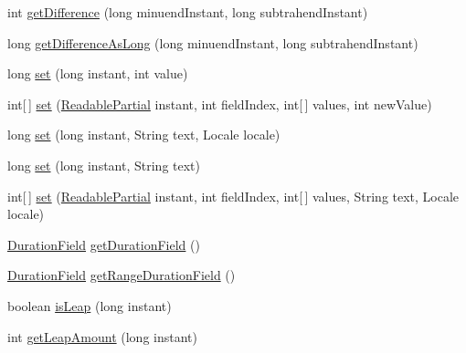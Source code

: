 \begin{DoxyCompactItemize}
\item 
int \hyperlink{classorg_1_1joda_1_1time_1_1field_1_1_unsupported_date_time_field_ad9c690727e67fbee862ec3e133f603d2}{get\-Difference} (long minuend\-Instant, long subtrahend\-Instant)
\item 
long \hyperlink{classorg_1_1joda_1_1time_1_1field_1_1_unsupported_date_time_field_ade939fccf0f23afa58b747b1e1174291}{get\-Difference\-As\-Long} (long minuend\-Instant, long subtrahend\-Instant)
\item 
long \hyperlink{classorg_1_1joda_1_1time_1_1field_1_1_unsupported_date_time_field_a009efc3018a1abd63bc52984d37a0e8b}{set} (long instant, int value)
\item 
int\mbox{[}$\,$\mbox{]} \hyperlink{classorg_1_1joda_1_1time_1_1field_1_1_unsupported_date_time_field_af8a830279fd53cc1f4e274abfbf19768}{set} (\hyperlink{interfaceorg_1_1joda_1_1time_1_1_readable_partial}{Readable\-Partial} instant, int field\-Index, int\mbox{[}$\,$\mbox{]} values, int new\-Value)
\item 
long \hyperlink{classorg_1_1joda_1_1time_1_1field_1_1_unsupported_date_time_field_a20e8669e6da34326c6fd56c904a6d735}{set} (long instant, String text, Locale locale)
\item 
long \hyperlink{classorg_1_1joda_1_1time_1_1field_1_1_unsupported_date_time_field_a03b971edb36dc3c4de38afba467a9820}{set} (long instant, String text)
\item 
int\mbox{[}$\,$\mbox{]} \hyperlink{classorg_1_1joda_1_1time_1_1field_1_1_unsupported_date_time_field_a0a4d5a929e35df332767b7441bf88c09}{set} (\hyperlink{interfaceorg_1_1joda_1_1time_1_1_readable_partial}{Readable\-Partial} instant, int field\-Index, int\mbox{[}$\,$\mbox{]} values, String text, Locale locale)
\item 
\hyperlink{classorg_1_1joda_1_1time_1_1_duration_field}{Duration\-Field} \hyperlink{classorg_1_1joda_1_1time_1_1field_1_1_unsupported_date_time_field_aff9c51f0f497129187379598a3d913e2}{get\-Duration\-Field} ()
\item 
\hyperlink{classorg_1_1joda_1_1time_1_1_duration_field}{Duration\-Field} \hyperlink{classorg_1_1joda_1_1time_1_1field_1_1_unsupported_date_time_field_a062e9b2f5bcd22a8a872a9384a59071b}{get\-Range\-Duration\-Field} ()
\item 
boolean \hyperlink{classorg_1_1joda_1_1time_1_1field_1_1_unsupported_date_time_field_a5ac7281470556026bb06a15c7c5cc5ce}{is\-Leap} (long instant)
\item 
int \hyperlink{classorg_1_1joda_1_1time_1_1field_1_1_unsupported_date_time_field_ad9a709745087fb9352db987011ae0ac2}{get\-Leap\-Amount} (long instant)

\end{DoxyCompactItemize}
